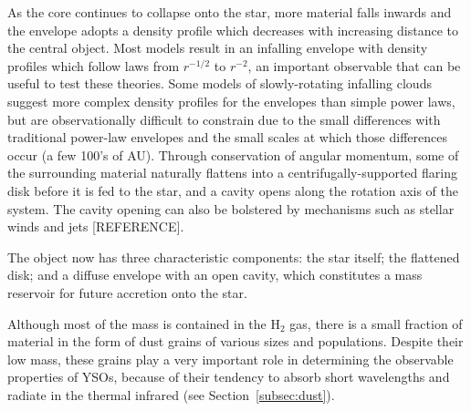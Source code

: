 As the core continues to collapse onto the star, more material falls inwards and the envelope adopts a density profile which decreases with increasing distance to the central object. Most models result in an infalling envelope with density profiles which follow laws from $r^{-1/2}$ to $r^{-2}$, an important observable that can be useful to test these theories. Some models of slowly-rotating infalling clouds suggest more complex density profiles for the envelopes \citep[e.g.][]{Ulrich:1976ho,Terebey:1984hi} than simple power laws, but are observationally difficult to constrain due to the small differences with traditional power-law envelopes and the small scales at which those differences occur (a few 100's of AU). Through conservation of angular momentum, some of the surrounding material naturally flattens into a centrifugally-supported flaring disk before it is fed to the star, and a cavity opens along the rotation axis of the system. The cavity opening can also be bolstered by mechanisms such as stellar winds and jets [REFERENCE].

The object now has three characteristic components: the star itself; the flattened disk; and a diffuse envelope with an open cavity, which constitutes a mass reservoir for future accretion onto the star.

Although most of the mass is contained in the $\textrm{H}_2$ gas, there is a small fraction of material in the form of dust grains of various sizes and populations. Despite their low mass, these grains play a very important role in determining the observable properties of YSOs, because of their tendency to absorb short wavelengths and radiate in the thermal infrared (see Section~\ref{subsec:dust}). 




